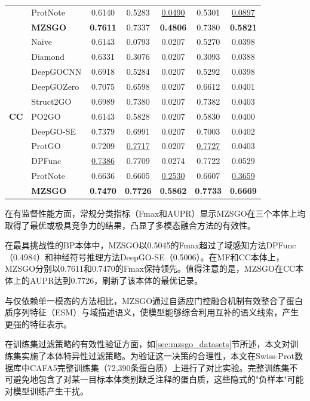 \begin{table}[htbp]
\begin{tabular}{llccccc}
 & ProtNote & 0.6140 & 0.5283 & \underline{0.0490} & 0.5301 & \underline{0.0897} \\
 & \textbf{MZSGO} & \textbf{0.7611} & 0.7337 & \textbf{0.4806} & 0.7380 & \textbf{0.5821} \\
\midrule
\multirow{11}{*}{\textbf{CC}} 
 & Naive & 0.6143 & 0.0793 & 0.0207 & 0.5270 & 0.0398 \\
 & Diamond & 0.6331 & 0.3076 & 0.0207 & 0.3093 & 0.0388 \\
 & DeepGOCNN & 0.6918 & 0.5284 & 0.0207 & 0.5292 & 0.0398 \\
 & DeepGOZero & 0.7075 & 0.6598 & 0.0207 & 0.6612 & 0.0401 \\
 & Struct2GO & 0.6989 & 0.7380 & 0.0207 & 0.7382 & 0.0403 \\
 & PO2GO & 0.6143 & 0.5828 & 0.0207 & 0.5830 & 0.0400 \\
 & DeepGO-SE & 0.7379 & 0.6991 & 0.0207 & 0.7003 & 0.0402 \\
 & ProtGO & 0.7209 & \underline{0.7717} & 0.0207 & \underline{0.7727} & 0.0403 \\
 & DPFunc & \underline{0.7386} & 0.7709 & 0.0274 & 0.7722 & 0.0529 \\
 & ProtNote & 0.6636 & 0.6605 & \underline{0.2530} & 0.6607 & \underline{0.3659} \\
 & \textbf{MZSGO} & \textbf{0.7470} & \textbf{0.7726} & \textbf{0.5862} & \textbf{0.7733} & \textbf{0.6669} \\
\bottomrule
\end{tabular}
\end{table}

在有监督性能方面，常规分类指标（Fmax和AUPR）显示MZSGO在三个本体上均取得了最优或极具竞争力的结果，凸显了多模态融合方法的有效性。

在最具挑战性的BP本体中，MZSGO以0.5045的Fmax超过了域感知方法DPFunc（0.4984）和神经符号推理方法DeepGO-SE（0.5006）。在MF和CC本体上，MZSGO分别以0.7611和0.7470的Fmax保持领先。值得注意的是，MZSGO在CC本体上的AUPR达到0.7726，刷新了该本体的最优记录。

与仅依赖单一模态的方法相比，MZSGO通过自适应门控融合机制有效整合了蛋白质序列特征（ESM）与域描述语义，使模型能够综合利用互补的语义线索，产生更强的特征表示。

在训练集过滤策略的有效性验证方面，如\ref{sec:mzsgo_datasets}节所述，本文对训练集实施了本体特异性过滤策略。为验证这一决策的合理性，本文在Swiss-Prot数据库中CAFA5完整训练集（72,390条蛋白质）上进行了对比实验。完整训练集不可避免地包含了对某一目标本体类别缺乏注释的蛋白质，这些隐式的"负样本"可能对模型训练产生干扰。

